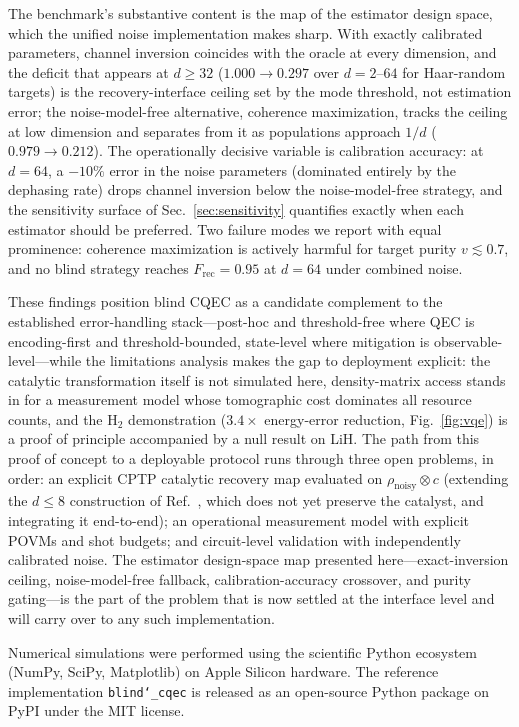 \documentclass[pra,twocolumn,superscriptaddress,longbibliography,floatfix,nofootinbib]{revtex4-2}
\newcommand{\Frec}{F_\mathrm{rec}}
\newcommand{\rhon}{\rho_\mathrm{noisy}}
\begin{document}
The benchmark's substantive content is the map of the estimator design space, which the unified noise implementation makes sharp.
With exactly calibrated parameters, channel inversion coincides with the oracle at every dimension, and the deficit that appears at $d \geq 32$ ($1.000 \to 0.297$ over $d = 2$--$64$ for Haar-random targets) is the recovery-interface ceiling set by the mode threshold, not estimation error; the noise-model-free alternative, coherence maximization, tracks the ceiling at low dimension and separates from it as populations approach $1/d$ ($0.979 \to 0.212$).
The operationally decisive variable is calibration accuracy: at $d = 64$, a $-10\%$ error in the noise parameters (dominated entirely by the dephasing rate) drops channel inversion below the noise-model-free strategy, and the sensitivity surface of Sec.~\ref{sec:sensitivity} quantifies exactly when each estimator should be preferred.
Two failure modes we report with equal prominence: coherence maximization is actively harmful for target purity $v \lesssim 0.7$, and no blind strategy reaches $\Frec = 0.95$ at $d = 64$ under combined noise.

These findings position blind CQEC as a candidate complement to the established error-handling stack---post-hoc and threshold-free where QEC is encoding-first and threshold-bounded, state-level where mitigation is observable-level---while the limitations analysis makes the gap to deployment explicit: the catalytic transformation itself is not simulated here, density-matrix access stands in for a measurement model whose tomographic cost dominates all resource counts, and the H$_2$ demonstration ($3.4\times$ energy-error reduction, Fig.~\ref{fig:vqe}) is a proof of principle accompanied by a null result on LiH.
The path from this proof of concept to a deployable protocol runs through three open problems, in order: an explicit CPTP catalytic recovery map evaluated on $\rhon \otimes c$ (extending the $d \leq 8$ construction of Ref.~\cite{Wakaura2026unified}, which does not yet preserve the catalyst, and integrating it end-to-end); an operational measurement model with explicit POVMs and shot budgets; and circuit-level validation with independently calibrated noise.
The estimator design-space map presented here---exact-inversion ceiling, noise-model-free fallback, calibration-accuracy crossover, and purity gating---is the part of the problem that is now settled at the interface level and will carry over to any such implementation.


\begin{acknowledgments}
Numerical simulations were performed using the scientific Python ecosystem (NumPy, SciPy, Matplotlib) on Apple Silicon hardware.
The reference implementation \texttt{blind\char`\_cqec} is released as an open-source Python package on PyPI under the MIT license.
\end{acknowledgments}
\end{document}
